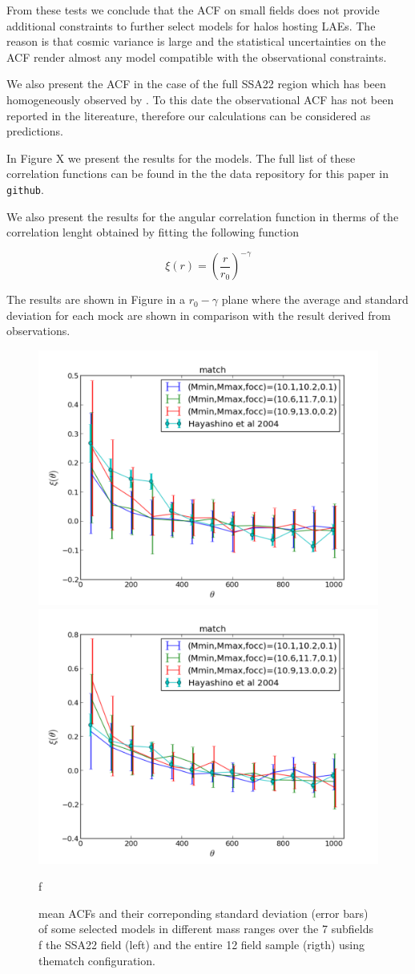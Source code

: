 \documentclass[usenatbib]{mn2e}
\begin{document}
From these tests we conclude that the ACF on small fields does not
provide additional constraints to further select models for halos
hosting LAEs. The reason is that cosmic variance is large and the
statistical uncertainties on the ACF render almost any model
compatible with the observational constraints. 

We also present the ACF in the case of the full SSA22
region which has been homogeneously observed by \citep{Yamada2012}. To
this date the observational ACF has not been reported in the
litereature, therefore our calculations can be considered as
predictions. 

In Figure X we present the results for the models. The full list of
these correlation functions can be found in the the data repository
for this paper in \verb"github". 

We also present the results for the angular correlation function in
therms of the correlation lenght obtained by fitting the following
function

\begin{equation}
\xi(r) = \left(\frac{r}{r_{0}}\right)^{-\gamma}
\end{equation}

The results are shown in Figure in a $r_{0}-\gamma$ plane where the
average and standard deviation for each mock are shown in comparison
with the result derived from observations. 


\begin{figure}
\begin{center}
\includegraphics[width=0.46\linewidth,angle=0]{./plots/match_large_correlation_selected_models.pdf}
\hspace{5mm}
\includegraphics[width=0.46\linewidth,angle=0]{./plots/match_full_correlation_selected_models.pdf}
\end{center} f
\caption{ mean ACFs   and their correponding standard deviation (error
  bars)  of some selected models in different mass ranges over the 7
  subfields  f the SSA22 field (left) and the entire 12 field sample
  (rigth) using thematch
  configuration. \label{figure:correlation_match} }  
  \end{figure}
\end{document}
